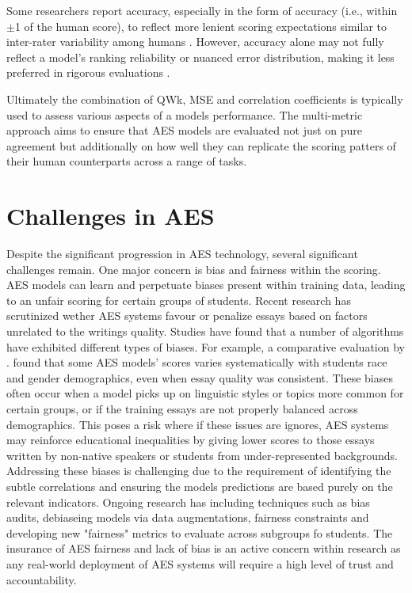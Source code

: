 \documentclass[8pt]{report}
\begin{document}
Some researchers report accuracy, especially in the form of  accuracy (i.e., within $\pm$1 of the human score), to reflect more lenient scoring expectations similar to inter-rater variability 
among humans \parencite{Shermis2013,Taghipour2016}. However, accuracy alone may not fully reflect a model’s ranking reliability or nuanced error distribution, making it less preferred in rigorous evaluations 
\parencite{Williamson2012,Yannakoudakis2011}.

Ultimately the combination of QWk, MSE and correlation coefficients is typically used to assess various aspects of a models performance. The multi-metric approach aims to ensure that AES models are evaluated not just on pure 
agreement but additionally on how well they can replicate the scoring patters of their human counterparts across a range of tasks.

\section{Challenges in AES}
Despite the significant progression in AES technology, several significant challenges remain. One major concern is bias and fairness within the scoring. AES models can learn and perpetuate 
biases present within training data, leading to an unfair scoring for certain groups of students. Recent research has scrutinized wether AES systems favour or penalize essays based on factors unrelated 
to the writings quality. Studies have found that a number of algorithms have exhibited different types of biases. For example, a comparative evaluation by \parencite{litman2024fairness}. found that some AES 
models' scores varies systematically with students race and gender demographics, even when essay quality was consistent. These biases often occur when a model picks up on linguistic styles or topics 
more common for certain groups, or if the training essays are not properly balanced across demographics. This poses a risk where if these issues are ignores, AES systems may reinforce educational inequalities 
by giving lower scores to those essays written by non-native speakers or students from under-represented backgrounds. Addressing these biases is challenging due to the requirement of identifying the subtle correlations 
and ensuring the models predictions are based purely on the relevant indicators. Ongoing research has including techniques such as bias audits, debiaseing models via data augmentations, fairness constraints and developing 
new "fairness" metrics to evaluate across subgroups fo students. The insurance of AES fairness and lack of bias is an active concern within research as any real-world deployment of AES systems will require
a high level of trust and accountability.
\end{document}
